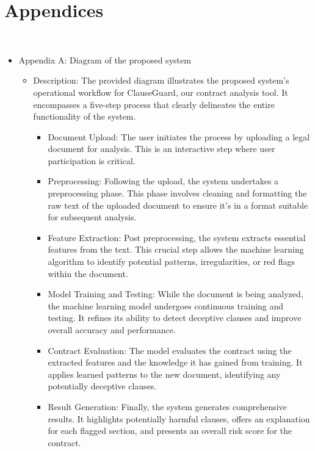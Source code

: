 \chapter{Appendices 
\label{Chapter::Appendices}}\


\begin{itemize}
        \item Appendix A: Diagram of the proposed system
        \begin{itemize}
            \item Description: The provided diagram illustrates the proposed system's operational workflow for ClauseGuard, our contract analysis tool. It encompasses a five-step process that clearly delineates the entire functionality of the system.
            \begin{itemize}
                \item Document Upload: The user initiates the process by uploading a legal document for analysis. This is an interactive step where user participation is critical.

                \item Preprocessing: Following the upload, the system undertakes a preprocessing phase. This phase involves cleaning and formatting the raw text of the uploaded document to ensure it's in a format suitable for subsequent analysis.

                \item Feature Extraction: Post preprocessing, the system extracts essential features from the text. This crucial step allows the machine learning algorithm to identify potential patterns, irregularities, or red flags within the document.

                \item Model Training and Testing: While the document is being analyzed, the machine learning model undergoes continuous training and testing. It refines its ability to detect deceptive clauses and improve overall accuracy and performance.

                \item Contract Evaluation: The model evaluates the contract using the extracted features and the knowledge it has gained from training. It applies learned patterns to the new document, identifying any potentially deceptive clauses.

                \item Result Generation: Finally, the system generates comprehensive results. It highlights potentially harmful clauses, offers an explanation for each flagged section, and presents an overall risk score for the contract.



\end{itemize}
\end{itemize}
\end{itemize}
